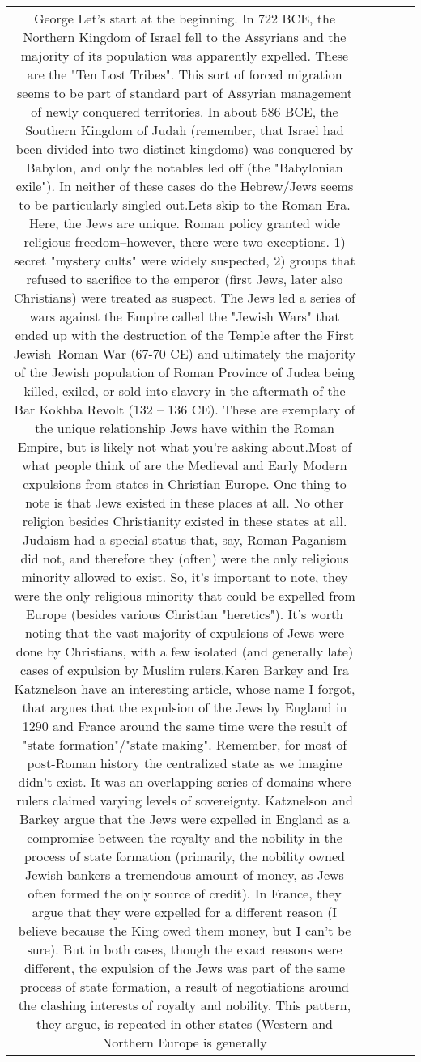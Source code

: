 \documentclass[11pt]{article}
\newlength\mylength
\begin{document}
\begin{center}
\begin{longtable}{|C{.65\mylength}|C{.30\mylength}|C{.12\mylength}|C{.12\mylength}|C{.12\mylength}|}
  \small George Let's start at the beginning. In 722 BCE, the Northern Kingdom of Israel fell to the Assyrians and the majority of its population was apparently expelled. These are the "Ten Lost Tribes". This sort of forced migration seems to be part of standard part of Assyrian management of newly conquered territories. In about 586 BCE, the Southern Kingdom of Judah (remember, that Israel had been divided into two distinct kingdoms) was conquered by Babylon, and only the notables led off (the "Babylonian exile"). In neither of these cases do the Hebrew/Jews seems to be particularly singled out.Lets skip to the Roman Era. Here, the Jews are unique. Roman policy granted wide religious freedom--however, there were two exceptions. 1) secret "mystery cults" were widely suspected, 2) groups that refused to sacrifice to the emperor (first Jews, later also Christians) were treated as suspect. The Jews led a series of wars against the Empire called the "Jewish Wars" that ended up with the destruction of the Temple after the First Jewish–Roman War (67-70 CE) and ultimately the majority of the Jewish population of Roman Province of Judea being killed, exiled, or sold into slavery in the aftermath of the Bar Kokhba Revolt (132 – 136 CE). These are exemplary of the unique relationship Jews have within the Roman Empire, but is likely not what you're asking about.Most of what people think of are the Medieval and Early Modern expulsions from states in Christian Europe. One thing to note is that Jews existed in these places at all. No other religion besides Christianity existed in these states at all. Judaism had a special status that, say, Roman Paganism did not, and therefore they (often) were the only religious minority allowed to exist. So, it's important to note, they were the only religious minority that could be expelled from Europe (besides various Christian "heretics"). It's worth noting that the vast majority of expulsions of Jews were done by Christians, with a few isolated (and generally late) cases of expulsion by Muslim rulers.Karen Barkey and Ira Katznelson have an interesting article, whose name I forgot, that argues that the expulsion of the Jews by England in 1290 and France around the same time were the result of "state formation"/"state making". Remember, for most of post-Roman history the centralized state as we imagine didn't exist. It was an overlapping series of domains where rulers claimed varying levels of sovereignty. Katznelson and Barkey argue that the Jews were expelled in England as a compromise between the royalty and the nobility in the process of state formation (primarily, the nobility owned Jewish bankers a tremendous amount of money, as Jews often formed the only source of credit). In France, they argue that they were expelled for a different reason (I believe because the King owed them money, but I can't be sure). But in both cases, though the exact reasons were different, the expulsion of the Jews was part of the same process of state formation, a result of negotiations around the clashing interests of royalty and nobility. This pattern, they argue, is repeated in other states (Western and Northern Europe is generally 
\end{longtable}
\end{center}
\end{document}
